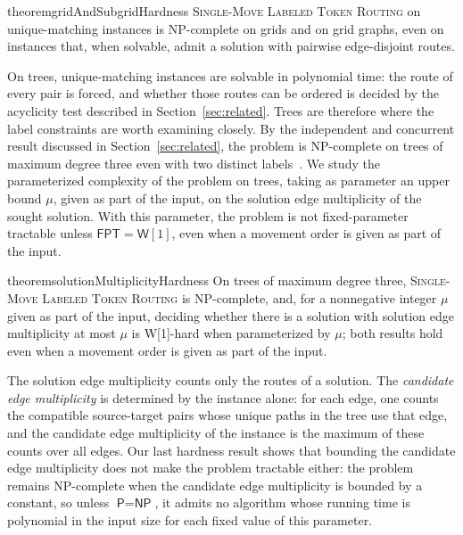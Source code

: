 \documentclass[a4paper,USenglish,thm-restate]{lipics-v2021}
\theoremstyle{problemstyle}
\begin{document}
\begin{restatable}{theorem}{gridAndSubgridHardness}
\label{thm:grid_and_subgrid_hardness}
\textsc{Single-Move Labeled Token Routing} on unique-matching instances is
\textsf{NP}-complete on grids and on grid graphs, even on instances that,
when solvable, admit a solution with pairwise edge-disjoint routes.
\end{restatable}


On trees, unique-matching instances are solvable in polynomial time: the
route of every pair is forced, and whether those routes can be ordered is
decided by the acyclicity test described in Section~\ref{sec:related}. Trees are therefore where
the label constraints are worth examining closely. By the independent and
concurrent result discussed in Section~\ref{sec:related}, the problem is
\textsf{NP}-complete on trees of maximum degree three even with two
distinct labels~\cite{Geft2026Trees}. We study the parameterized complexity
of the problem on trees, taking as parameter an upper bound $\mu$, given as
part of the input, on the solution edge multiplicity of the sought solution.
With this parameter, the problem is not fixed-parameter tractable unless
$\textsf{FPT}=\textsf{W}[1]$, even when a movement order is given as part of
the input.

\begin{restatable}{theorem}{solutionMultiplicityHardness}
\label{thm:sol_multiplicity_hardness}
On trees of maximum degree three, \textsc{Single-Move Labeled Token Routing}
is \textsf{NP}-complete, and, for a nonnegative integer $\mu$ given as part
of the input, deciding whether there is a solution with solution edge
multiplicity at most $\mu$ is \textsf{W}[1]-hard when parameterized by
$\mu$; both results hold even when a movement order is given as part of
the input.
\end{restatable}

The solution edge multiplicity counts only the routes of a solution.
The \emph{candidate edge multiplicity} is determined by the instance alone:
for each edge, one counts the compatible source-target pairs whose unique
paths in the tree use that edge, and the candidate edge multiplicity of the
instance is the maximum of these counts over all edges. Our last hardness
result shows that bounding the candidate edge multiplicity does not make the
problem tractable either: the problem remains \textsf{NP}-complete when the
candidate edge multiplicity is bounded by a constant, so unless
$\textsf{P}=\textsf{NP}$, it admits no algorithm whose running time is
polynomial in the input size for each fixed value of this parameter.
\end{document}
